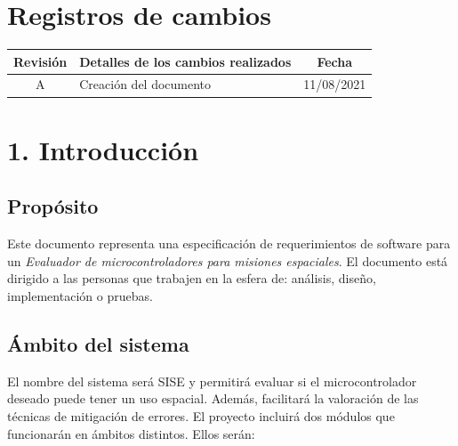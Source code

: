 \documentclass[
11pt, %
codirector, %
]{charter}
\begin{document}
\maketitle
\thispagestyle{empty}
\pagebreak


\thispagestyle{empty}
{\setlength{\parskip}{0pt}
\tableofcontents{}
}
\pagebreak


\section*{Registros de cambios}
\label{sec:registro}

\begin{table}[ht]
\label{tab:registro}
\centering
\begin{tabularx}{\linewidth}{@{}|c|X|c|@{}}
\hline
\rowcolor[HTML]{C0C0C0} 
Revisión & \multicolumn{1}{c|}{\cellcolor[HTML]{C0C0C0}Detalles de los cambios realizados} & Fecha      \\ \hline
A & Creación del documento & 11/08/2021 \\ \hline
\end{tabularx}
\end{table}

\pagebreak

\section{1. Introducción}
\label{sec:introduccion}

\subsection{Propósito}
\label{sub:proposito}

Este documento representa una especificación de requerimientos de software para un \emph{Evaluador de microcontroladores para misiones espaciales}.
El documento está dirigido a las personas que trabajen en la esfera de: análisis, diseño, implementación o pruebas.

\subsection{Ámbito del sistema}
\label{sub:ambito}

El nombre del sistema será SISE y permitirá evaluar si el microcontrolador deseado puede tener un uso espacial.
Además, facilitará la valoración de las técnicas de mitigación de errores.
El proyecto incluirá dos módulos que funcionarán en ámbitos distintos.
Ellos serán:
\end{document}
